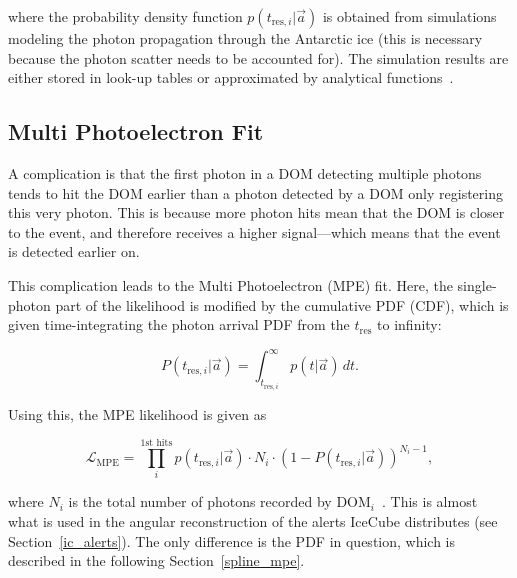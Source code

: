 where the probability density function $p(t_{\text{res},i}|\vec{a})$ is obtained from simulations modeling the photon propagation through the Antarctic ice (this is necessary because the photon scatter needs to be accounted for). The simulation results are either stored in look-up tables or approximated by analytical functions~\cite{Ahrens2004}.

\subsection{Multi Photoelectron Fit}
A complication is that the first photon in a DOM detecting multiple photons tends to hit the DOM earlier than a photon detected by a DOM only registering this very photon. This is because more photon hits mean that the DOM is closer to the event, and therefore receives a higher signal---which means that the event is detected earlier on.

This complication leads to the Multi Photoelectron (MPE) fit. Here, the single-photon part of the likelihood is modified by the cumulative PDF (CDF), which is given time-integrating the photon arrival PDF from the $t_\text{res}$ to infinity:

\begin{equation}
    P(t_{\text{res},i}|\vec{a}) = \int^{\infty}_{t_{\text{res},i}}p(t|\vec{a})\,dt.
\end{equation}

Using this, the MPE likelihood is given as

\begin{equation}
    \mathcal{L}_\text{MPE} = \prod_i^\text{1st hits} p(t_{\text{res},i}|\vec{a}) \cdot N_i \cdot (1-P(t_{\text{res},i}|\vec{a}))^{N_i-1},
\end{equation}

where $N_i$ is the total number of photons recorded by $\text{DOM}_i$~\cite{Ahrens2004}. This is almost what is used in the angular reconstruction of the alerts IceCube distributes (see Section~\ref{ic_alerts}). The only difference is the PDF in question, which is described in the following Section~\ref{spline_mpe}.

